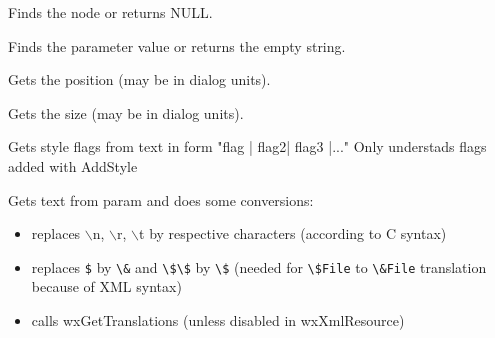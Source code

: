 \label{wxxmlresourcehandlergetparamnode}


Finds the node or returns NULL.


\label{wxxmlresourcehandlergetparamvalue}


Finds the parameter value or returns the empty string.


\label{wxxmlresourcehandlergetposition}


Gets the position (may be in dialog units).


\label{wxxmlresourcehandlergetsize}


Gets the size (may be in dialog units).


\label{wxxmlresourcehandlergetstyle}


Gets style flags from text in form "flag | flag2| flag3 |..."
Only understads flags added with AddStyle


\label{wxxmlresourcehandlergettext}


Gets text from param and does some conversions:

\begin{itemize}\itemsep=0pt
\item replaces $\backslash$n, $\backslash$r, $\backslash$t by respective characters (according to C syntax)
\item replaces \verb+$+ by \verb+\&+ and \verb+\$\$+ by \verb+\$+ (needed for \verb+\$File+ to \verb+\&File+
translation because of XML syntax)
\item calls wxGetTranslations (unless disabled in wxXmlResource)
\end{itemize}

